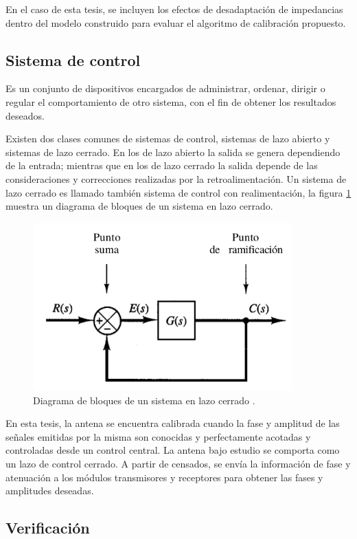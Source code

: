 En el caso de esta tesis, se incluyen los efectos de desadaptación de impedancias dentro del modelo construido para evaluar el
algoritmo de calibración propuesto.


\subsection{Sistema de control}

Es un conjunto de dispositivos encargados de administrar, ordenar, dirigir o regular el comportamiento de otro sistema, con el
fin de obtener los resultados deseados.

Existen dos clases comunes de sistemas de control, sistemas de lazo abierto y sistemas de lazo cerrado. En los de lazo abierto la
salida se genera dependiendo de la entrada; mientras que en los de lazo cerrado la salida depende de las consideraciones y
correcciones realizadas por la retroalimentación. Un sistema de lazo cerrado es llamado también sistema de control con
realimentación, la figura \ref{fig:closedLoop} muestra un diagrama de bloques de un sistema en lazo cerrado.

\begin{figure}[H]
 \centering
 \includegraphics[width=10cm]{gfx/closedLoop.png}
 \caption{Diagrama de bloques de un sistema en lazo cerrado \cite{Tobergte2013}.}
 \label{fig:closedLoop}
\end{figure}

En esta tesis, la antena se encuentra calibrada cuando la fase y amplitud de las señales emitidas por la misma son conocidas y
perfectamente acotadas y controladas desde un control central. La antena bajo estudio se comporta como un lazo de control
cerrado. A partir de censados, se envía la información de fase y atenuación a los módulos transmisores y receptores para obtener
las fases y amplitudes deseadas.


\subsection{Verificación}

